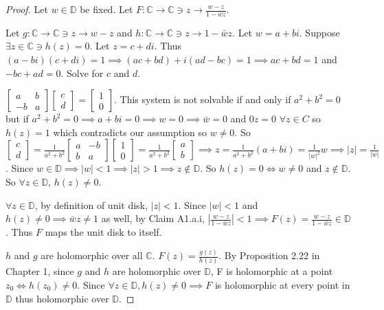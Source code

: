\documentclass{article}
\newcommand{\C}{\mathbb{C}}
\newcommand{\abs}[1]{\left\lvert #1\right\rvert}
\begin{document}
\begin{proof}
    Let $w \in \mathbb{D}$ be fixed. Let $F: \C \to \C \ni z \to \frac{w - z}{1 - \bar{w}z}$.

    Let $g: \C \to \C \ni z \to w - z$ and $h: \C \to \C \ni z \to 1 - \bar{w}z$. Let $w = a + bi$. Suppose $\exists z \in \C \ni h(z) = 0 $. Let $z = c + di$. Thus $(a - bi)(c + di) = 1 \implies (ac + bd) + i(ad - bc) = 1 \implies ac + bd = 1$ and $-bc + ad = 0$. Solve for $c$ and $d$.
    
    $\begin{bmatrix}
        a & b \\ -b & a
    \end{bmatrix}\begin{bmatrix}
        c \\ d
    \end{bmatrix} = \begin{bmatrix}
        1 \\ 0
    \end{bmatrix}$. This system is not solvable if and only if $a^2 + b^2 = 0$ but if $a^2 + b^2 = 0 \implies a + bi = 0 \implies w = 0 \implies \bar{w} = 0$ and $0z = 0$ $\forall z \in C$ so $h(z) = 1$ which contradicts our assumption so $w \neq 0$. So $\begin{bmatrix}
        c \\ d
    \end{bmatrix} = \frac{1}{a^2 + b^2}\begin{bmatrix}
        a & -b \\ b & a
    \end{bmatrix}\begin{bmatrix}
        1 \\ 0
    \end{bmatrix} = \frac{1}{a^2 + b^2} \begin{bmatrix}
        a \\ b
    \end{bmatrix} \implies z = \frac{1}{a^2 + b^2}(a + bi) = \frac{1}{|w|^2}w \implies |z| = \frac{1}{|w|}$. Since $w \in \mathbb{D} \implies |w| < 1 \implies |z| > 1 \implies z \not \in \mathbb{D}$. So $h(z) = 0 \iff w \neq 0$ and $z \not \in \mathbb{D}$. So $\forall z \in \mathbb{D}$, $h(z) \neq 0$.
    
    $\forall z \in \mathbb{D}$, by definition of unit disk, $|z| < 1$. Since $|w| < 1$ and $h(z) \neq 0 \implies \bar{w}z \neq 1$ as well, by Claim A1.a.i, $\abs{\frac{w - z}{1 - \bar{w}z}} < 1 \implies F(z) = \frac{w - z}{1 - \bar{w}z} \in \mathbb{D}$. Thus $F$ maps the unit disk to itself.
    
    $h$ and $g$ are holomorphic over all $\C$. $F(z) = \frac{g(z)}{h(z)}$. By Proposition 2.22 in Chapter 1, since $g$ and $h$ are holomorphic over $\mathbb{D}$, F is holomorphic at a point $z_0 \iff h(z_0) \neq 0$. Since $\forall z \in \mathbb{D}, h(z) \neq 0 \implies F$ is holomorphic at every point in $\mathbb{D}$ thus holomorphic over $\mathbb{D}$.            
\end{proof}
\end{document}
